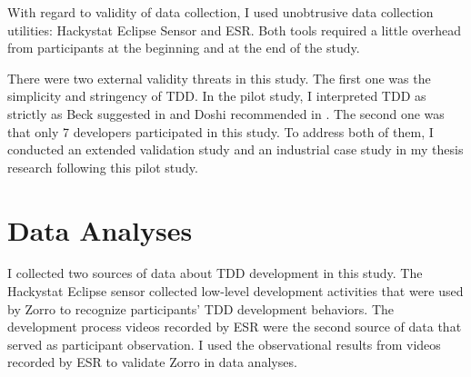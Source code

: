 With regard to validity of data collection, I used unobtrusive data collection utilities: Hackystat Eclipse Sensor and ESR. Both tools required a little overhead from participants \cite{csdl2-03-12,Hackystat} at the beginning and at the end of the study.

There were two external validity threats in this study. The first one was the simplicity and stringency of TDD. In the pilot study, I interpreted TDD as strictly as Beck suggested in \cite{Beck:01,Beck:03} and Doshi recommended in \cite{TDDRhythm,TDDQuickReference}. The second one was that only 7 developers participated in this study. To address both of them, I conducted an extended validation study and an industrial case study in my thesis research following this pilot study.

\section{Data Analyses}
\label{sec:Pilot-Analysis}
I collected two sources of data about TDD development in this study. The Hackystat Eclipse sensor collected low-level development activities that were used by Zorro to recognize participants' TDD development behaviors. The development process videos recorded by ESR were the second source of data that served as participant observation. I used the observational results from videos recorded by ESR to validate Zorro in data analyses.


